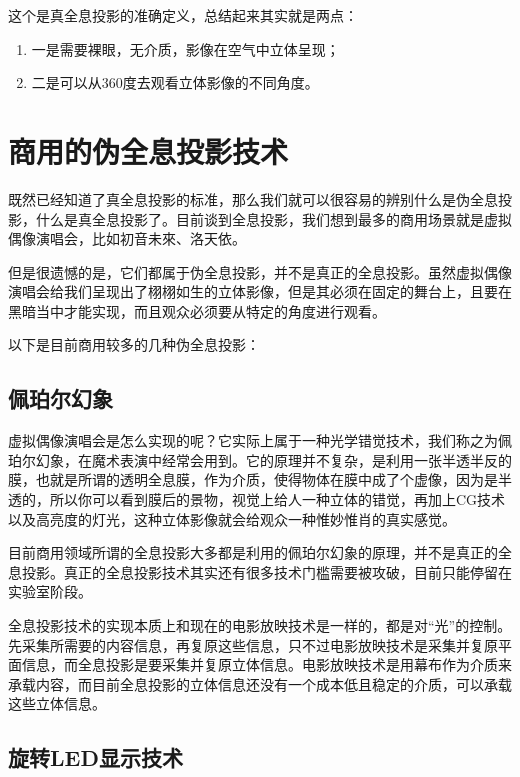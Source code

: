 \documentclass[UTF8]{ctexart}
\begin{document}
这个是真全息投影的准确定义，总结起来其实就是两点：

\begin{enumerate}
    \item 一是需要裸眼，无介质，影像在空气中立体呈现；
    \item 二是可以从360度去观看立体影像的不同角度。
\end{enumerate}



\section{商用的伪全息投影技术}

既然已经知道了真全息投影的标准，那么我们就可以很容易的辨别什么是伪全息投影，什么是真全息投影了。目前谈到全息投影，我们想到最多的商用场景就是虚拟偶像演唱会，比如初音未來、洛天依。

但是很遗憾的是，它们都属于伪全息投影，并不是真正的全息投影。虽然虚拟偶像演唱会给我们呈现出了栩栩如生的立体影像，但是其必须在固定的舞台上，且要在黑暗当中才能实现，而且观众必须要从特定的角度进行观看。

以下是目前商用较多的几种伪全息投影：

\subsection{佩珀尔幻象}

虚拟偶像演唱会是怎么实现的呢？它实际上属于一种光学错觉技术，我们称之为佩珀尔幻象，在魔术表演中经常会用到。它的原理并不复杂，是利用一张半透半反的膜，也就是所谓的透明全息膜，作为介质，使得物体在膜中成了个虚像，因为是半透的，所以你可以看到膜后的景物，视觉上给人一种立体的错觉，再加上CG技术以及高亮度的灯光，这种立体影像就会给观众一种惟妙惟肖的真实感觉。

目前商用领域所谓的全息投影大多都是利用的佩珀尔幻象的原理，并不是真正的全息投影。真正的全息投影技术其实还有很多技术门槛需要被攻破，目前只能停留在实验室阶段。

全息投影技术的实现本质上和现在的电影放映技术是一样的，都是对“光”的控制。先采集所需要的内容信息，再复原这些信息，只不过电影放映技术是采集并复原平面信息，而全息投影是要采集并复原立体信息。电影放映技术是用幕布作为介质来承载内容，而目前全息投影的立体信息还没有一个成本低且稳定的介质，可以承载这些立体信息。

\subsection{旋转LED显示技术}
\end{document}
